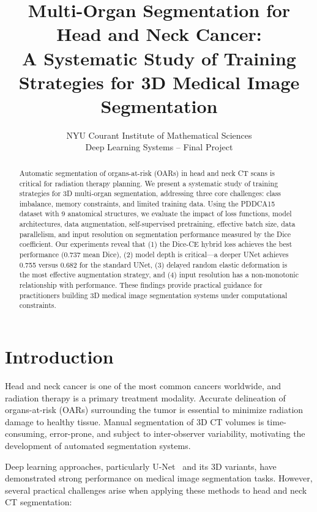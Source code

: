 \documentclass[10pt,twocolumn]{article}
\title{\textbf{Multi-Organ Segmentation for Head and Neck Cancer:\\A Systematic Study of Training Strategies for 3D Medical Image Segmentation}}
\author{
    NYU Courant Institute of Mathematical Sciences\\
    Deep Learning Systems -- Final Project
}
\date{}
\begin{document}
\maketitle

\begin{abstract}
Automatic segmentation of organs-at-risk (OARs) in head and neck CT scans is critical for radiation therapy planning. We present a systematic study of training strategies for 3D multi-organ segmentation, addressing three core challenges: class imbalance, memory constraints, and limited training data. Using the PDDCA15 dataset with 9 anatomical structures, we evaluate the impact of loss functions, model architectures, data augmentation, self-supervised pretraining, effective batch size, data parallelism, and input resolution on segmentation performance measured by the Dice coefficient. Our experiments reveal that (1) the Dice-CE hybrid loss achieves the best performance (0.737 mean Dice), (2) model depth is critical---a deeper UNet achieves 0.755 versus 0.682 for the standard UNet, (3) delayed random elastic deformation is the most effective augmentation strategy, and (4) input resolution has a non-monotonic relationship with performance. These findings provide practical guidance for practitioners building 3D medical image segmentation systems under computational constraints.
\end{abstract}

\section{Introduction}
\label{sec:intro}

Head and neck cancer is one of the most common cancers worldwide, and radiation therapy is a primary treatment modality. Accurate delineation of organs-at-risk (OARs) surrounding the tumor is essential to minimize radiation damage to healthy tissue. Manual segmentation of 3D CT volumes is time-consuming, error-prone, and subject to inter-observer variability, motivating the development of automated segmentation systems.

Deep learning approaches, particularly U-Net~\cite{ronneberger2015unet} and its 3D variants, have demonstrated strong performance on medical image segmentation tasks. However, several practical challenges arise when applying these methods to head and neck CT segmentation:
\end{document}
